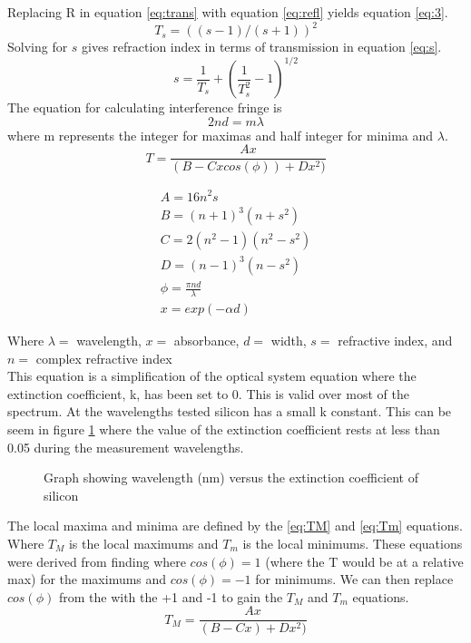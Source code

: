 \documentclass[10pt,a4paper]{article}
\begin{document}
\begin{multicols}{2}
Replacing R in equation \ref{eq:trans} with equation \ref{eq:refl} yields equation \ref{eq:3}.
\begin{equation}
\label{eq:3}
T_s = ((s-1)/(s+1))^2
\end{equation}
Solving for $s$ gives refraction index in terms of transmission in equation \ref{eq:s}.
\begin{equation}
\label{eq:s}
s = \frac{1}{T_s} + (\frac{1}{T_s^2}  - 1)^{1/2}
\end{equation}
The equation for calculating interference fringe is
\begin{equation}\label{eq:interfringe}
2nd = m \lambda
\end{equation}
where m represents the integer for maximas and half integer for minima and $\lambda$.
\begin{equation}
\label{eq:TransReg}
T = \dfrac{Ax}{(B-Cx cos(\phi) )+Dx^2)}
\end{equation}

\begin{subequations}\label{eq:TransReg}
    \begin{align}
	A= 16n^2s \label{eq:A}\\
	B = (n+1)^3(n+s^2) \label{eq:B}\\
	C = 2(n^2-1)(n^2-s^2) \label{eq:C}\\
	D = (n-1)^3(n-s^2) \label{eq:D}\\
	\phi = \frac{\pi n d}{ \lambda} \label{eq:phi}\\
	x = exp(-\alpha d) \label{eq:x}
    \end{align}
\end{subequations}

Where $\lambda =$ wavelength, $x =$ absorbance, $d =$ width,  $s =$ refractive index, and $n =$ complex refractive index\\
This equation is a simplification of the optical system equation where the extinction coefficient, k, has been set to 0. This is valid over most of the spectrum\cite{marq}. At the wavelengths tested silicon has a small k constant. This can be seem in figure \ref{Sik} where the value of the extinction coefficient rests at less than 0.05 during the measurement wavelengths.
\begin{figure}[H]
\label{Sik}
\caption{Graph showing wavelength (nm) versus the extinction coefficient of silicon\cite{siK}}
\end{figure}

The local maxima and minima are defined by the \ref{eq:TM} and \ref{eq:Tm} equations. Where $T_M$ is the local maximums and $T_m$ is the local minimums.
These equations were derived from finding where $cos(\phi) = 1$ (where the T would be at a relative max) for the maximums and  $cos(\phi) = -1$ for minimums. We can then replace $cos(\phi)$ from the with the +1 and -1 to gain the $T_M$ and $T_m$ equations\cite{marq}.
\begin{equation}
\label{eq:TM}
T_M = \dfrac{Ax}{(B-Cx)+Dx^2)}
\end{equation}


\end{multicols}
\end{document}
